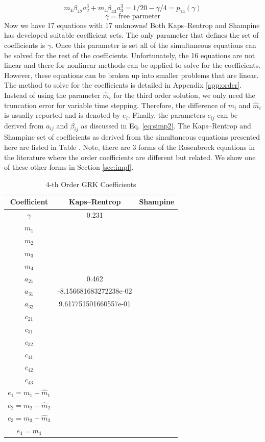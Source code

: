 \documentclass{ansconf}
\numberwithin{equation}{section}
\begin{document}
\begin{equation}
   m_4\beta_{42}a_2^3 + m_4\beta_{43}a_3^3 = 1/20 - \gamma/4 = p_{14}\left(\gamma\right)
\end{equation}
\begin{equation}
   \gamma = \mathrm{free \,\, parmeter}
\end{equation}
Now we have 17 equations with 17 unknowns! Both Kaps--Rentrop and Shampine has developed suitable coefficient sets. The only parameter that defines the set of coefficients is $\gamma$. Once this parameter is set all of the simultaneous equations can be solved for the rest of the coefficients. Unfortunately, the 16 equations are not linear and there for nonlinear methods can be applied to solve for the coefficients. However, these equations can be broken up into smaller problems that are linear. The method to solve for the coefficients is detailed in Appendix \ref{app:order}. Instead of using the parameter $\hat{m}_i$ for the third order solution, we only need the truncation error for variable time stepping. Therefore, the difference of $m_i$ and $\hat{m}_i$ is usually reported and is denoted by $e_i$. Finally, the parameters $c_{ij}$ can be derived from $a_{ij}$ and $\beta_{ij}$ as discussed in Eq. \eqref{eq:simp2}. The Kaps--Rentrop and Shampine set of coefficients as derived from the simultaneous equations presented here are listed in Table . Note, there are 3 forms of the Rosenbrock equations in the literature where the order coefficients are different but related. We show one of these other forms in Section \ref{sec:impl}.
\begin{table}
\caption{4-th Order GRK Coefficients}
\label{tab:coefs}
\centering
\begin{tabular}{ccc}
\toprule
Coefficient & Kaps--Rentrop & Shampine \tabularnewline
\midrule
\midrule
$\gamma$ & 0.231 & \tabularnewline
\midrule
$m_1$ & & \tabularnewline
\midrule
$m_2$ & & \tabularnewline
\midrule
$m_3$ & & \tabularnewline
\midrule
$m_4$ & & \tabularnewline
\midrule
$a_{21}$ & 0.462 & \tabularnewline
\midrule
$a_{31}$ & -8.156681683272238e-02 & \tabularnewline
\midrule
$a_{32}$ &  9.617751501660557e-01 & \tabularnewline
\midrule
$c_{21}$ & & \tabularnewline
\midrule
$c_{31}$ & & \tabularnewline
\midrule
$c_{32}$ & & \tabularnewline
\midrule
$c_{41}$ & & \tabularnewline
\midrule
$c_{42}$ & & \tabularnewline
\midrule
$c_{43}$ & & \tabularnewline
\midrule
$e_1 = m_1 - \hat{m}_1$ & & \tabularnewline
\midrule
$e_2 = m_2 - \hat{m}_2$ & & \tabularnewline
\midrule
$e_3 = m_3 - \hat{m}_3$ & & \tabularnewline
\midrule
$e_4 = m_4$ & & \tabularnewline
\bottomrule
\end{tabular}
\end{table}
\end{document}
